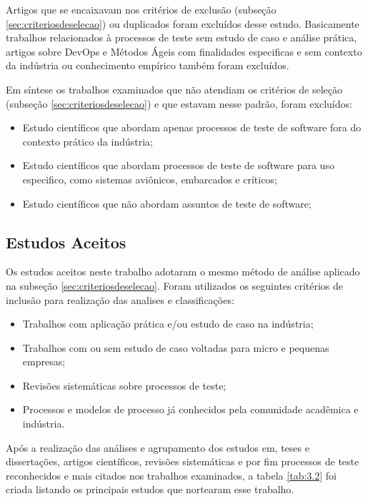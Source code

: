 Artigos que se encaixavam nos critérios de exclusão (subseção \ref{sec:criteriosdeselecao}) ou duplicados foram excluídos desse estudo. Basicamente trabalhos relacionados à processos de teste sem estudo de caso e análise prática, artigos sobre DevOps e Métodos Ágeis com finalidades especificas e sem contexto da indústria ou conhecimento empírico também foram excluídos.

Em síntese os trabalhos examinados que não atendiam os critérios de seleção (subseção \ref{sec:criteriosdeselecao}) e que estavam nesse padrão, foram excluídos:

\begin{itemize}
\item Estudo científicos que abordam apenas processos de teste de software fora do contexto prático da indústria;
\item Estudo científicos que abordam processos de teste de software para uso especifico, como sistemas aviônicos, embarcados e críticos;
\item Estudo científicos que não abordam assuntos de teste de software;
\end{itemize}

\subsection{Estudos Aceitos}
\label{sec:estudosaceitos}
Os estudos aceitos neste trabalho adotaram o mesmo método de análise aplicado na subseção \ref{sec:criteriosdeselecao}. Foram utilizados os seguintes critérios de inclusão para realização das analises e classificações:

\begin{itemize}
\item Trabalhos com aplicação prática e/ou estudo de caso na indústria;
\item Trabalhos com ou sem estudo de caso voltadas para micro e pequenas empresas;
\item Revisões sistemáticas sobre processos de teste;
\item Processos  e  modelos  de  processo  já  conhecidos  pela  comunidade  acadêmica  e
indústria.
\end{itemize}

Após a realização das análises e agrupamento dos estudos em, teses e dissertações, artigos científicos, revisões sistemáticas e por fim processos de teste reconhecidos e mais citados nos trabalhos examinados, a tabela \ref{tab:3.2} foi criada listando os principais estudos que nortearam esse trabalho.

